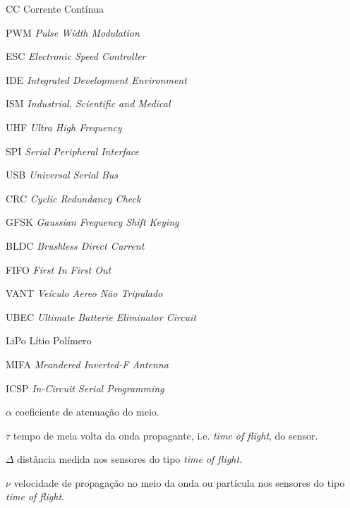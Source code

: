 \documentclass[
  	11pt,%
 	openright,%
 	twoside,%
 	a4paper,%
 	english,%
 	brazil %
 	]{abntex2}
\begin{document}


\listoffigures*
\cleardoublepage

\listoftables*
\cleardoublepage

\begin{siglas}
  \item[CC] Corrente Contínua
  \item[PWM] \textit{Pulse Width Modulation}
  \item[ESC] \textit{Electronic Speed Controller}
  \item[IDE] \textit{Integrated Development Environment}
  \item[ISM] \textit{Industrial, Scientific and Medical}
  \item[UHF] \textit{Ultra High Frequency}
  \item[SPI] \textit{Serial Peripheral Interface} 
  \item[USB] \textit{Universal Serial Bus}
  \item[CRC] \textit{Cyclic Redundancy Check}
  \item[GFSK] \textit{Gaussian Frequency Shift Keying}
  \item[BLDC] \textit{Brushless Direct Current}
  \item[FIFO] \textit{First In First Out}
  \item[VANT] \textit{Veículo Aereo Não Tripulado}
  \item[UBEC] \textit{Ultimate Batterie Eliminator Circuit}
  \item[LiPo] Lítio Polímero
  \item[MIFA] \textit{Meandered Inverted-F Antenna}
  \item[ICSP] \textit{In-Circuit Serial Programming}
\end{siglas}

\begin{simbolos}
  \item[$ \alpha $] coeficiente de atenuação do meio.
  \item[$ \tau $] tempo de meia volta da onda propagante, i.e. \textit{time of flight}, do sensor.
  \item[$ \Delta $] distância medida nos sensores do tipo \textit{time of flight}.
  \item[$ \nu $] velocidade de propagação no meio da onda ou partícula nos sensores do tipo \textit{time of flight}.
\end{simbolos}
\end{document}
